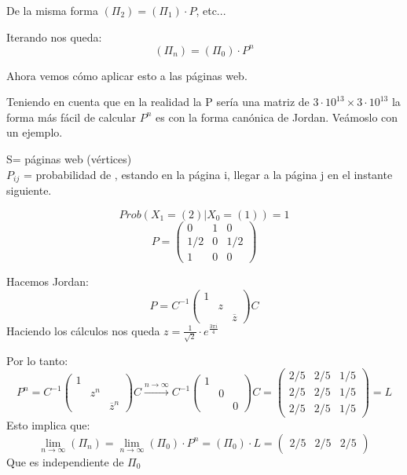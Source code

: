 De la misma forma $(\Pi_2) = (\Pi_1) \cdot P$, etc...

Iterando nos queda:
$$\left(\Pi_n\right) = \left(\Pi_0\right) \cdot P^n$$

Ahora vemos cómo aplicar esto a las páginas web.


Teniendo en cuenta que en la realidad la P sería una matriz de $3\cdot 10^{13} \times 3\cdot 10^{13}$ la forma más fácil de calcular $P^n$ es con la forma canónica de Jordan. Veámoslo con un ejemplo.
\begin{example}[1]{}



	\begin{center}
	\centering
\end{center}


	S= páginas web (vértices)\\
	$P_{ij}$ = probabilidad de , estando en la página i, llegar a la página j en el instante siguiente.

	$$Prob(X_1 = (2)| X_0 = (1)) = 1$$
	$$P =\left(\begin{matrix}
	0 & 1 & 0\\
	1/2 & 0 & 1/2\\
	1 & 0 & 0
	\end{matrix}\right)$$

	Hacemos Jordan:
	$$P = C^{-1} \left(\begin{matrix}
	1&&\\
	&z&\\
	&&\overline{z}
	\end{matrix}\right) C$$
	Haciendo los cálculos nos queda $z = \frac{1}{\sqrt{2}}\cdot e^{\frac{3\pi i}{4}}$

	Por lo tanto:
	$$P^n =  C^{-1} \left(\begin{matrix}
	1&&\\
	&z^n&\\
	&&\overline{z}^n
	\end{matrix}\right) C \stackrel{n\rightarrow \infty}{\rightarrow}  C^{-1} \left(\begin{matrix}
	1&&\\
	&0&\\
	&&0
	\end{matrix}\right) C = \left(\begin{matrix}
	2/5&2/5&1/5\\
	2/5&2/5&1/5\\
	2/5&2/5&1/5
	\end{matrix}\right) = L$$
	Esto implica que:
	$$\lim_{n\rightarrow\infty}\left(\Pi_n\right) = \lim_{n\rightarrow\infty}\left(\Pi_0\right)\cdot P^n = \left(\Pi_0\right)\cdot L =( \begin{matrix}
	2/5&2/5&2/5
	\end{matrix})$$
	Que es independiente de $\Pi_0$
\end{example}

